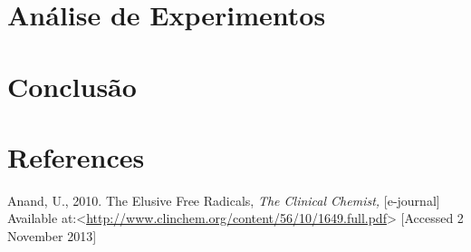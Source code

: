 \documentclass[12pt]{report}
\begin{document}
\section{Análise de Experimentos}
\lipsum

\section{Conclusão}
\lipsum

\newpage
\section*{References}

Anand, U., 2010. The Elusive Free Radicals, \textit{The Clinical Chemist,} [e-journal] Available at:<\url{http://www.clinchem.org/content/56/10/1649.full.pdf}> [Accessed 2 November 2013]
\newline
\newline
\end{document}
